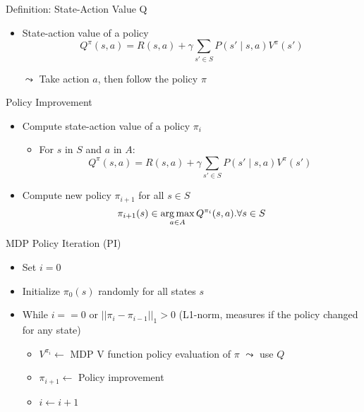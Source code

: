 \begin{frame}[c]{Definition: State-Action Value Q}

\begin{itemize}
	\item State-action value of a policy
	$$Q^\pi(s,a) = R(s,a) + \gamma \sum_{s' \in S} P(s' \mid s,a) V^\pi(s')$$
	\item[$\leadsto$] Take action $a$, then follow the policy $\pi$
\end{itemize}

\end{frame}
\begin{frame}[c]{Policy Improvement}

\begin{itemize}
	\item Compute state-action value of a policy $\pi_i$
	\begin{itemize}
		\item For $s$ in $S$ and $a$ in $A$:
				$$Q^\pi(s,a) = R(s,a) + \gamma \sum_{s' \in S} P(s' \mid s,a) V^\pi(s')$$
	\end{itemize}
	\medskip
	\pause
	\item Compute new policy $\pi_{i+1}$ for all $s\in S$
	$$ \pi_{i+1}(s) \in \operatorname*{arg\,max}_{a\in A} Q^{\pi_i} (s,a). \forall s \in S $$
	

\end{itemize}

\end{frame}
\begin{frame}[c]{MDP Policy Iteration (PI)}

\begin{itemize}
	\item Set $i=0$
	\item Initialize $\pi_0(s)$ randomly for all states $s$
	\item While $i == 0$ or $||\pi_i - \pi_{i-1}||_1 > 0$ (L1-norm, measures if the policy changed for any state)
	\begin{itemize}
		\item $V^{\pi_i} \gets$ MDP V function policy \alert{evaluation} of $\pi$ \hspace{1em} $\leadsto$ use $Q$
		\item $\pi_{i+1} \gets$ Policy \alert{improvement}
		\item $i \gets i+1$
	\end{itemize}
\end{itemize}

\end{frame}
